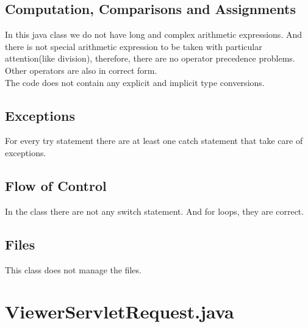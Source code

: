 \documentclass{article}
\begin{document}
\subsection{Computation, Comparisons and Assignments}
In this java class we do not have long and complex arithmetic expressions. And there is not special arithmetic expression to be taken with particular attention(like division), therefore, there are no operator precedence problems.\\
Other operators are also in correct form.\\
The code does not contain any explicit and implicit type conversions.
\subsection{Exceptions}
For every try statement there are at least one catch statement that take care of exceptions.
\subsection{Flow of Control}
In the class there are not any switch statement. And for loops,  they are correct.
\subsection{Files}
This class does not manage the files.
\newpage

\section{ViewerServletRequest.java}
\end{document}
